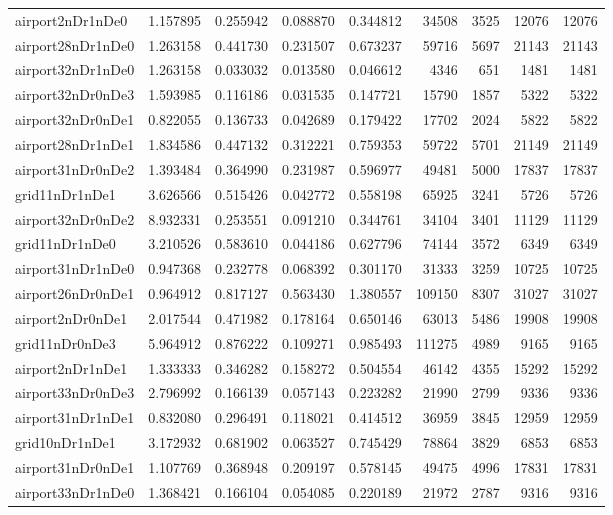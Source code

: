 \begin{longtable}{|l|r|r|r|r|r|r|r|r|}
airport2nDr1nDe0 & 1.157895 & 0.255942 & 0.088870 & 0.344812 & 34508 & 3525 & 12076 & 12076 \\
airport28nDr1nDe0 & 1.263158 & 0.441730 & 0.231507 & 0.673237 & 59716 & 5697 & 21143 & 21143 \\
airport32nDr1nDe0 & 1.263158 & 0.033032 & 0.013580 & 0.046612 & 4346 & 651 & 1481 & 1481 \\
airport32nDr0nDe3 & 1.593985 & 0.116186 & 0.031535 & 0.147721 & 15790 & 1857 & 5322 & 5322 \\
airport32nDr0nDe1 & 0.822055 & 0.136733 & 0.042689 & 0.179422 & 17702 & 2024 & 5822 & 5822 \\
airport28nDr1nDe1 & 1.834586 & 0.447132 & 0.312221 & 0.759353 & 59722 & 5701 & 21149 & 21149 \\
airport31nDr0nDe2 & 1.393484 & 0.364990 & 0.231987 & 0.596977 & 49481 & 5000 & 17837 & 17837 \\
grid11nDr1nDe1 & 3.626566 & 0.515426 & 0.042772 & 0.558198 & 65925 & 3241 & 5726 & 5726 \\
airport32nDr0nDe2 & 8.932331 & 0.253551 & 0.091210 & 0.344761 & 34104 & 3401 & 11129 & 11129 \\
grid11nDr1nDe0 & 3.210526 & 0.583610 & 0.044186 & 0.627796 & 74144 & 3572 & 6349 & 6349 \\
airport31nDr1nDe0 & 0.947368 & 0.232778 & 0.068392 & 0.301170 & 31333 & 3259 & 10725 & 10725 \\
airport26nDr0nDe1 & 0.964912 & 0.817127 & 0.563430 & 1.380557 & 109150 & 8307 & 31027 & 31027 \\
airport2nDr0nDe1 & 2.017544 & 0.471982 & 0.178164 & 0.650146 & 63013 & 5486 & 19908 & 19908 \\
grid11nDr0nDe3 & 5.964912 & 0.876222 & 0.109271 & 0.985493 & 111275 & 4989 & 9165 & 9165 \\
airport2nDr1nDe1 & 1.333333 & 0.346282 & 0.158272 & 0.504554 & 46142 & 4355 & 15292 & 15292 \\
airport33nDr0nDe3 & 2.796992 & 0.166139 & 0.057143 & 0.223282 & 21990 & 2799 & 9336 & 9336 \\
airport31nDr1nDe1 & 0.832080 & 0.296491 & 0.118021 & 0.414512 & 36959 & 3845 & 12959 & 12959 \\
grid10nDr1nDe1 & 3.172932 & 0.681902 & 0.063527 & 0.745429 & 78864 & 3829 & 6853 & 6853 \\
airport31nDr0nDe1 & 1.107769 & 0.368948 & 0.209197 & 0.578145 & 49475 & 4996 & 17831 & 17831 \\
airport33nDr1nDe0 & 1.368421 & 0.166104 & 0.054085 & 0.220189 & 21972 & 2787 & 9316 & 9316 \\

\end{longtable}
